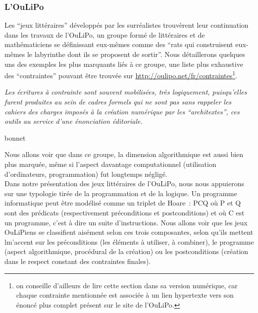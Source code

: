 \documentclass{article}
\newenvironment{citationbox}
{\begin{center}
		\begin{minipage}{.8\textwidth}
		}
		{
		\end{minipage}	
\end{center}
}
\begin{document}
			\subsubsection{L'OuLiPo}
				Les ``jeux littéraires'' développés par les surréalistes trouvèrent leur continuation dans les travaux de l'OuLiPo, un groupe formé de littéraires et de mathématiciens se définissant eux-mêmes comme des ``rats qui construisent eux-mêmes le labyrinthe dont ils se proposent de sortir''. Nous détaillerons quelques uns des exemples les plus marquants liés à ce groupe, une liste plus exhaustive des ``contraintes'' pouvant être trouvée sur \href{http://oulipo.net/fr/contraintes}{http://oulipo.net/fr/contraintes}\footnote{on conseille d'ailleurs de lire cette section dans sa version numérique, car chaque contrainte mentionnée est associée à un lien hypertexte vers son énoncé plus complet présent sur le site de l'OuLiPo.}.
				\begin{citationbox}
					\textit{Les écritures à contrainte sont souvent mobilisées, très logiquement, puisqu’elles furent produites au sein de cadres formels qui ne sont pas sans rappeler les cahiers des charges imposés à la création numérique par les ``architextes'', ces outils au service d’une énonciation éditoriale.}\begin{flushright}
						bonnet
					\end{flushright}
				\end{citationbox}
				
				Nous allons voir que dans ce groupe, la dimension algorithmique est aussi bien plus marquée, même si l'aspect davantage computationnel (utilisation d'ordinateurs, programmation) fut longtemps négligé.\\
				
				Dans notre présentation des jeux littéraires de l'OuLiPo, nous nous appuierons sur une typologie tirée de la programmation et de la logique. Un programme informatique peut être modélisé comme un triplet de Hoare~: {P}C{Q} où P et Q sont des prédicats (respectivement préconditions et postconditions) et où C est un programme, c'est à dire un suite d'instructions. Nous allons voir que les jeux OuLiPiens se classifient aisément selon ces trois composantes, selon qu'ils mettent lm'accent sur les préconditions (les éléments à utiliser, à combiner), le programme (aspect algorithmique, procédural de la création) ou les postconditions (création dans le respect constant des contraintes finales).
				
\end{document}
